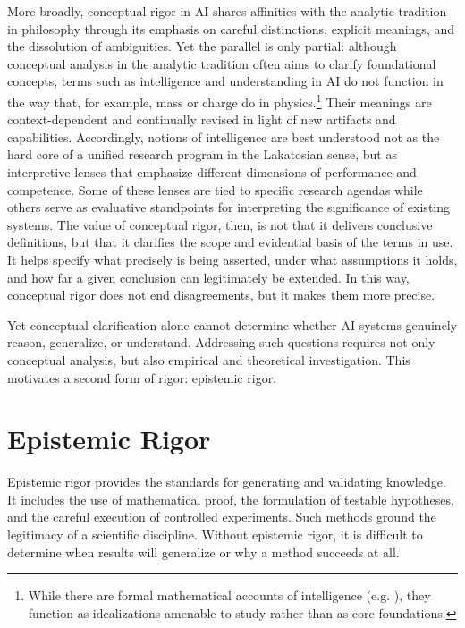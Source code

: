 \documentclass{article}
\begin{document}
More broadly, conceptual rigor in AI shares affinities with the analytic tradition in philosophy through its emphasis on careful distinctions, explicit meanings, and the dissolution of ambiguities.
Yet the parallel is only partial: although conceptual analysis in the analytic tradition often aims to clarify foundational concepts, terms such as intelligence and understanding in AI do not function in the way that, for example, mass or charge do in physics.\footnote{While there are formal mathematical accounts of intelligence (e.g. \cite{legg2007universal}), they function as idealizations amenable to study rather than as core foundations.}
Their meanings are context-dependent and continually revised in light of new artifacts and capabilities.
Accordingly, notions of intelligence are best understood not as the hard core of a unified research program in the Lakatosian sense, but as interpretive lenses that emphasize different dimensions of performance and competence.
Some of these lenses are tied to specific research agendas while others serve as evaluative standpoints for interpreting the significance of existing systems.
The value of conceptual rigor, then, is not that it delivers conclusive definitions, but that it clarifies the scope and evidential basis of the terms in use.
It helps specify what precisely is being asserted, under what assumptions it holds, and how far a given conclusion can legitimately be extended.
In this way, conceptual rigor does not end disagreements, but it makes them more precise.

Yet conceptual clarification alone cannot determine whether AI systems genuinely reason, generalize, or understand.
Addressing such questions requires not only conceptual analysis, but also empirical and theoretical investigation.
This motivates a second form of rigor: epistemic rigor.



\section{Epistemic Rigor}
\label{sec:EpistemicRigor}

Epistemic rigor provides the standards for generating and validating knowledge.
It includes the use of mathematical proof, the formulation of testable hypotheses, and the careful execution of controlled experiments.
Such methods ground the legitimacy of a scientific discipline.
Without epistemic rigor, it is difficult to determine when results will generalize or why a method succeeds at all.
\end{document}
